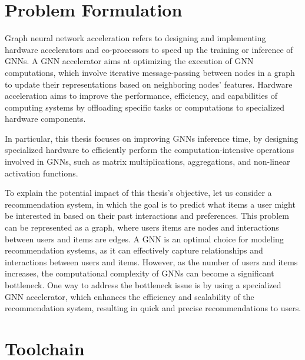 \documentclass[11pt,a4paper,twocolumn]{article}
\begin{document}

\section{Problem Formulation}
\label{sec:problem-formulation}%

Graph neural network acceleration refers to designing and implementing hardware accelerators and co-processors to speed up the training or inference of GNNs.
A GNN accelerator aims at optimizing the execution of GNN computations, which involve iterative message-passing between nodes in a graph to update their representations based on neighboring nodes' features.
Hardware acceleration aims to improve the performance, efficiency, and capabilities of computing systems by offloading specific tasks or computations to specialized hardware components.

In particular, this thesis focuses on improving GNNs inference time, by designing specialized hardware to efficiently perform the computation-intensive operations involved in GNNs, such as matrix multiplications, aggregations, and non-linear activation functions.

To explain the potential impact of this thesis's objective, let us consider a recommendation system, in which the goal is to predict what items a user might be interested in based on their past interactions and preferences.
This problem can be represented as a graph, where users items are nodes and interactions between users and items are edges.
A GNN is an optimal choice for modeling recommendation systems, as it can effectively capture relationships and interactions between users and items.
However, as the number of users and items increases, the computational complexity of GNNs can become a significant bottleneck.
One way to address the bottleneck issue is by using a specialized GNN accelerator, which enhances the efficiency and scalability of the recommendation system, resulting in quick and precise recommendations to users.


\section{Toolchain}
\label{sec:toolchain}%
\end{document}
